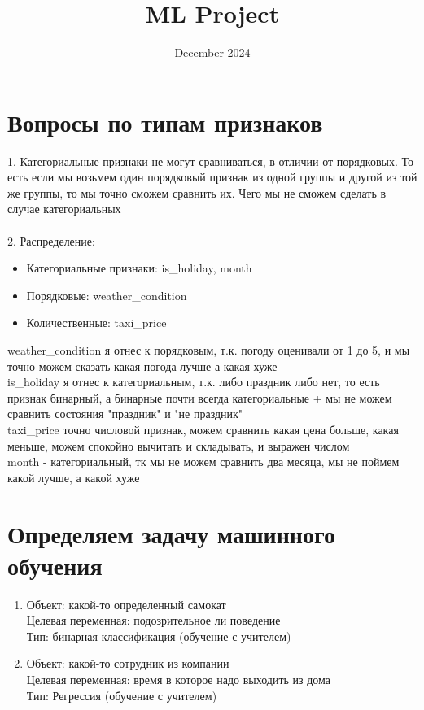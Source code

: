 \documentclass{article}
\title{ML Project}
\date{December 2024}
\begin{document}
\section{Вопросы по типам признаков}
1. Категориальные признаки не могут сравниваться, в отличии от порядковых. То есть если мы возьмем один порядковый признак из одной группы и другой из той же группы, то мы точно сможем сравнить их. Чего мы не сможем сделать в случае категориальных \\\\
2. Распределение:
\begin{itemize}
    \item Категориальные признаки: is\_holiday, month
    \item Порядковые: weather\_condition
    \item Количественные: taxi\_price
\end{itemize}
weather\_condition я отнес к порядковым, т.к. погоду оценивали от 1 до 5, и мы точно можем сказать какая погода лучше а какая хуже \\
is\_holiday я отнес к категориальным, т.к. либо праздник либо нет, то есть признак бинарный, а бинарные почти всегда категориальные + мы не можем сравнить состояния "праздник" и "не праздник" \\
taxi\_price точно числовой признак, можем сравнить какая цена больше, какая меньше, можем спокойно вычитать и складывать, и выражен числом \\
month - категориальный, тк мы не можем сравнить два месяца, мы не поймем какой лучше, а какой хуже




\section{Определяем задачу машинного обучения}

\begin{enumerate}
    \item Объект: какой-то определенный самокат \\ 
    Целевая переменная: подозрительное ли поведение \\ 
    Тип: бинарная классификация (обучение с учителем) \\
    \item Объект: какой-то сотрудник из компании \\ 
    Целевая переменная: время в которое надо выходить из дома \\ 
    Тип: Регрессия (обучение с учителем)
\end{enumerate}
\end{document}

